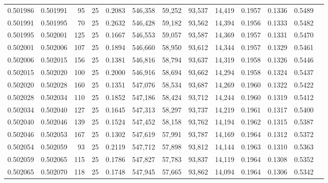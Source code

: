 \begin{tabular}{rrrrrrrrrrrrr}
0.501986 & 0.501991 &  95 &  25 &                                     0.2083 & 546,358 &  59,252 &  93,537 &  14,419 & 0.1957 & 0.1336 & 0.5489 \\
0.501991 & 0.501995 &  70 &  25 &                                     0.2632 & 546,428 &  59,182 &  93,562 &  14,394 & 0.1956 & 0.1333 & 0.5482 \\
0.501995 & 0.502001 & 125 &  25 &                                     0.1667 & 546,553 &  59,057 &  93,587 &  14,369 & 0.1957 & 0.1331 & 0.5470 \\
0.502001 & 0.502006 & 107 &  25 &                                     0.1894 & 546,660 &  58,950 &  93,612 &  14,344 & 0.1957 & 0.1329 & 0.5461 \\
0.502006 & 0.502015 & 156 &  25 &                                     0.1381 & 546,816 &  58,794 &  93,637 &  14,319 & 0.1958 & 0.1326 & 0.5446 \\
0.502015 & 0.502020 & 100 &  25 &                                     0.2000 & 546,916 &  58,694 &  93,662 &  14,294 & 0.1958 & 0.1324 & 0.5437 \\
0.502020 & 0.502028 & 160 &  25 &                                     0.1351 & 547,076 &  58,534 &  93,687 &  14,269 & 0.1960 & 0.1322 & 0.5422 \\
0.502028 & 0.502034 & 110 &  25 &                                     0.1852 & 547,186 &  58,424 &  93,712 &  14,244 & 0.1960 & 0.1319 & 0.5412 \\
0.502034 & 0.502040 & 127 &  25 &                                     0.1645 & 547,313 &  58,297 &  93,737 &  14,219 & 0.1961 & 0.1317 & 0.5400 \\
0.502040 & 0.502046 & 139 &  25 &                                     0.1524 & 547,452 &  58,158 &  93,762 &  14,194 & 0.1962 & 0.1315 & 0.5387 \\
0.502046 & 0.502053 & 167 &  25 &                                     0.1302 & 547,619 &  57,991 &  93,787 &  14,169 & 0.1964 & 0.1312 & 0.5372 \\
0.502054 & 0.502059 &  93 &  25 &                                     0.2119 & 547,712 &  57,898 &  93,812 &  14,144 & 0.1963 & 0.1310 & 0.5363 \\
0.502059 & 0.502065 & 115 &  25 &                                     0.1786 & 547,827 &  57,783 &  93,837 &  14,119 & 0.1964 & 0.1308 & 0.5352 \\
0.502065 & 0.502070 & 118 &  25 &                                     0.1748 & 547,945 &  57,665 &  93,862 &  14,094 & 0.1964 & 0.1306 & 0.5342 \\

\end{tabular}
